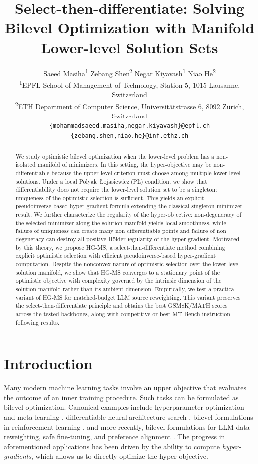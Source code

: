 \documentclass{article}
\title{Select-then-differentiate: Solving Bilevel Optimization with Manifold Lower-level Solution Sets
}
\author{
Saeed Masiha\textsuperscript{1}
\quad Zebang Shen\textsuperscript{2}
\quad Negar Kiyavash\textsuperscript{1}
\quad Niao He\textsuperscript{2}\\
\textsuperscript{1}EPFL School of Management of Technology, Station 5, 1015 Lausanne, Switzerland\\
\textsuperscript{2}ETH Department of Computer Science, Universit\"atstrasse 6, 8092 Z\"urich, Switzerland\\
\texttt{\{mohammadsaeed.masiha,negar.kiyavash\}@epfl.ch}\\
\texttt{\{zebang.shen,niao.he\}@inf.ethz.ch}
}
\date{}
\theoremstyle{normaltheorem}
\begin{document}
\doparttoc
\faketableofcontents
\maketitle

\begin{abstract}
We study optimistic bilevel optimization when the lower-level problem has a non-isolated manifold of minimizers. In this setting, the hyper-objective may be non-differentiable because the upper-level criterion must choose among multiple lower-level solutions. Under a local Polyak--{\L}ojasiewicz (P{\L}) condition, we show that differentiability does not require the lower-level solution set to be a singleton: uniqueness of the optimistic selection is sufficient. This yields an explicit pseudoinverse-based hyper-gradient formula extending the classical singleton-minimizer result. We further characterize the regularity of the hyper-objective: non-degeneracy of the selected minimizer along the solution manifold yields local smoothness, while failure of uniqueness can create many non-differentiable points and failure of non-degeneracy can destroy all positive H\"older regularity of the hyper-gradient. Motivated by this theory, we propose HG-MS, a select-then-differentiate method combining explicit optimistic selection with efficient pseudoinverse-based hyper-gradient computation. Despite the nonconvex nature of optimistic selection over the lower-level solution manifold, we show that HG-MS converges to a stationary point of the optimistic objective with complexity governed by the intrinsic dimension of the solution manifold rather than its ambient dimension.
Empirically, we test a practical variant of HG-MS for matched-budget LLM source reweighting. This variant preserves the select-then-differentiate principle and obtains the best GSM8K/MATH scores across the tested backbones, along with competitive or best MT-Bench instruction-following results.
\end{abstract}




\section{Introduction}\label{sec:intro}
Many modern machine learning tasks involve an upper objective that evaluates the outcome of an inner training procedure. Such tasks can be formulated as bilevel optimization. Canonical examples include hyperparameter optimization and meta-learning \citep{feurer2019hyperparameter,liu2021investigating,bertinetto2018meta,finn2017maml}, differentiable neural architecture search \citep{liu2019darts}, bilevel formulations in reinforcement learning \citep{hong2023two}, and more recently,  bilevel formulations for LLM data reweighting, safe fine-tuning, and preference alignment \citep{pan2025scalebio,shen2025seal,jian2025spo}.
The progress in aforementioned applications has been driven by the ability to compute
\emph{hyper-gradients}, which allows us to directly optimize the hyper-objective.
\end{document}

